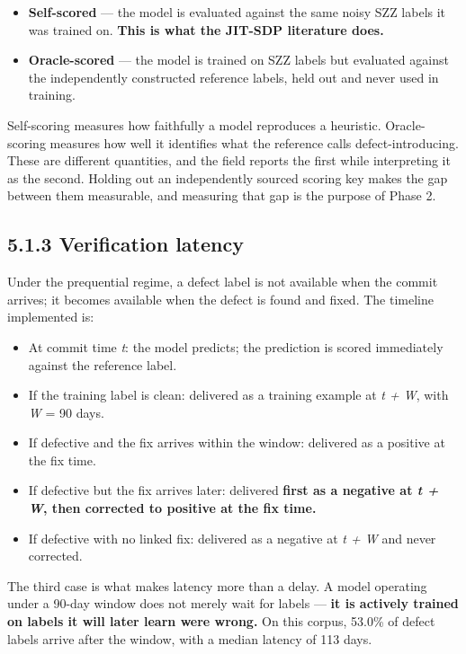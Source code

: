 \begin{itemize}
\tightlist
\item
  \textbf{Self-scored} --- the model is evaluated against the same noisy
  SZZ labels it was trained on. \textbf{This is what the JIT-SDP
  literature does.}
\item
  \textbf{Oracle-scored} --- the model is trained on SZZ labels but
  evaluated against the independently constructed reference labels, held
  out and never used in training.
\end{itemize}

Self-scoring measures how faithfully a model reproduces a heuristic.
Oracle-scoring measures how well it identifies what the reference calls
defect-introducing. These are different quantities, and the field
reports the first while interpreting it as the second. Holding out an
independently sourced scoring key makes the gap between them measurable,
and measuring that gap is the purpose of Phase 2.

\subsection{5.1.3 Verification latency}\label{verification-latency}

Under the prequential regime, a defect label is not available when the
commit arrives; it becomes available when the defect is found and fixed.
The timeline implemented is:

\begin{itemize}
\tightlist
\item
  At commit time \emph{t}: the model predicts; the prediction is scored
  immediately against the reference label.
\item
  If the training label is clean: delivered as a training example at
  \emph{t + W}, with \emph{W} = 90 days.
\item
  If defective and the fix arrives within the window: delivered as a
  positive at the fix time.
\item
  If defective but the fix arrives later: delivered \textbf{first as a
  negative at \emph{t + W}, then corrected to positive at the fix time.}
\item
  If defective with no linked fix: delivered as a negative at \emph{t +
  W} and never corrected.
\end{itemize}

The third case is what makes latency more than a delay. A model
operating under a 90-day window does not merely wait for labels ---
\textbf{it is actively trained on labels it will later learn were
wrong.} On this corpus, 53.0\% of defect labels arrive after the window,
with a median latency of 113 days.

